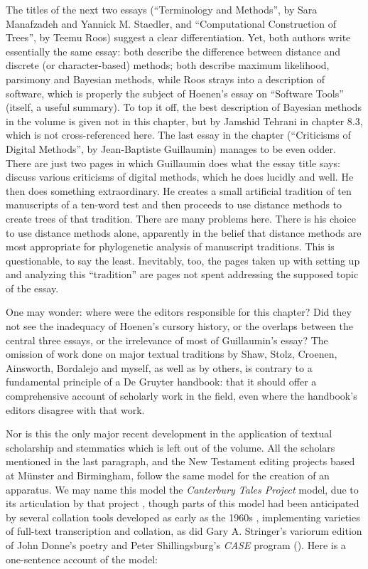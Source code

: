 \begin{review}
The titles of the next two essays (``Terminology and Methods'',
by Sara Manafzadeh and Yannick M. Staedler, and ``Computational
Construction of Trees'', by Teemu Roos) suggest a clear differentiation.
Yet, both authors write essentially the same essay: both describe the
difference between distance and discrete (or character-based) methods;
both describe maximum likelihood, parsimony and Bayesian methods, while
Roos strays into a description of software, which is properly the
subject of Hoenen's essay on ``Software Tools'' (itself, a useful
summary). To top it off, the best description of Bayesian methods in the
volume is given not in this chapter, but by Jamshid Tehrani in chapter
8.3, which is not cross-referenced here. The last essay in the chapter
(``Criticisms of Digital Methods'', by Jean-Baptiste Guillaumin) manages
to be even odder. There are just two pages in which Guillaumin does what
the essay title says: discuss various criticisms of digital methods,
which he does lucidly and well. He then does something extraordinary. He
creates a small artificial tradition of ten manuscripts of a ten-word
test and then proceeds to use distance methods to create trees of that
tradition. There are many problems here. There is his choice to use
distance methods alone, apparently in the belief that distance methods
are most appropriate for phylogenetic analysis of manuscript traditions.
This is questionable, to say the least. Inevitably, too, the pages taken
up with setting up and analyzing this ``tradition'' are pages not spent
addressing the supposed topic of the essay.

One may wonder: where were the editors responsible for this
chapter? Did they not see the inadequacy of Hoenen's cursory history, or
the overlaps between the central three essays, or the irrelevance of
most of Guillaumin's essay? The omission of work done on major textual
traditions by Shaw, Stolz, Croenen, Ainsworth, Bordalejo and myself, as
well as by others, is contrary to a fundamental principle of a De
Gruyter handbook: that it should offer a comprehensive account of
scholarly work in the field, even where the handbook's editors disagree
with that work.

Nor is this the only major recent development in the
application of textual scholarship and stemmatics which is left out of
the volume. All the scholars mentioned in the last paragraph, and the
New Testament editing projects based at Münster and Birmingham, follow
the same model for the creation of an apparatus. We may name this model
the \emph{Canterbury Tales Project} model, due to its articulation by
that project \parencite{robinson_canterbury_1993}, though parts of this model had been
anticipated by several collation tools developed as early as the 1960s \parencite{hockey_guide_1980}, implementing varieties of full-text transcription and
collation, as did Gary A. Stringer's variorum edition of John Donne's
poetry \parencite{donne_digitaldonne_1981} and Peter Shillingsburg's \emph{CASE} program
(\citeyear{shillingsburg_scholarly_1986}). Here is a one-sentence account of the model:


\end{review}
